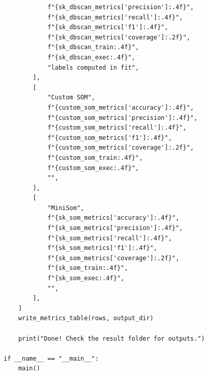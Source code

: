 \documentclass[runningheads]{ctexart}
\begin{document}
\begin{lstlisting}
            f"{sk_dbscan_metrics['precision']:.4f}",
            f"{sk_dbscan_metrics['recall']:.4f}",
            f"{sk_dbscan_metrics['f1']:.4f}",
            f"{sk_dbscan_metrics['coverage']:.2f}",
            f"{sk_dbscan_train:.4f}",
            f"{sk_dbscan_exec:.4f}",
            "labels computed in fit",
        ],
        [
            "Custom SOM",
            f"{custom_som_metrics['accuracy']:.4f}",
            f"{custom_som_metrics['precision']:.4f}",
            f"{custom_som_metrics['recall']:.4f}",
            f"{custom_som_metrics['f1']:.4f}",
            f"{custom_som_metrics['coverage']:.2f}",
            f"{custom_som_train:.4f}",
            f"{custom_som_exec:.4f}",
            "",
        ],
        [
            "MiniSom",
            f"{sk_som_metrics['accuracy']:.4f}",
            f"{sk_som_metrics['precision']:.4f}",
            f"{sk_som_metrics['recall']:.4f}",
            f"{sk_som_metrics['f1']:.4f}",
            f"{sk_som_metrics['coverage']:.2f}",
            f"{sk_som_train:.4f}",
            f"{sk_som_exec:.4f}",
            "",
        ],
    ]
    write_metrics_table(rows, output_dir)

    print("Done! Check the result folder for outputs.")

if __name__ == "__main__":
    main()
\end{lstlisting}
\end{document}
